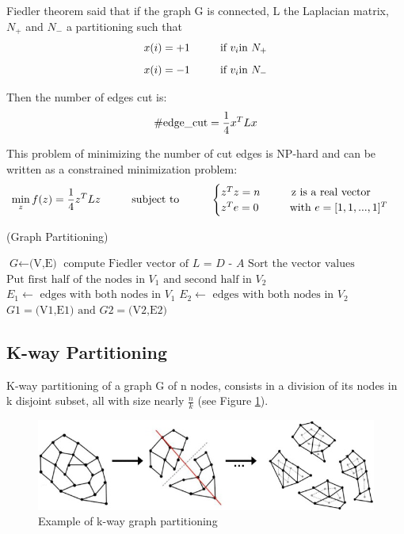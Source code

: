 \documentclass[]{usiinfbachelorproject}
\newcommand\tab[1][1cm]{\hspace*{#1}}
\begin{document}
Fiedler theorem said that if the graph G is connected, L the Laplacian matrix, $N_+$ and $N_-$ a partitioning such that
\begin{equation}\notag
x(i) = +1 \tab \text{if } v_i \text{in } N_+ 
\end{equation}
\begin{equation}\notag
x(i) = -1 \tab \text{if } v_i \text{in } N_-
\end{equation}

Then the number of edges cut is:
\begin{equation}\notag
\#\text{edge\_cut} = \frac{1}{4}x^T L x
\end{equation}

This problem of minimizing the number of cut edges is NP-hard and can be written as a constrained minimization problem:
\begin{equation}\notag
\min\limits_z f(z)=\frac{1}{4} z^T L z \tab \text{subject to} \tab 
\begin{cases}
z^T z = n \tab \text{z is a real vector}\\
z^T e = 0 \tab \text{with } e=[1,1,...,1]^T
\end{cases}
\end{equation}


\begin{algorithm}
\caption{ (Graph Partitioning)}\label{gpartitioning}
\begin{algorithmic}[1]
\State $\textit{G} \gets \text{(V,E)}$
\State $\text{compute Fiedler vector of } \textit{L = D - A}$
\State $\text{Sort the vector values}$
\State $\text{Put first half of the nodes in } V_1 \text{ and second half in } V_2$
\State $ E_1 \gets \text{ edges with both nodes in } V_1$
\State $ E_2 \gets \text{ edges with both nodes in } V_2$\\
\Return $\textit{G1} = \text{(V1,E1) and } \textit{G2} = \text{(V2,E2)}$
\EndProcedure
\end{algorithmic}
\end{algorithm}



\subsection{K-way Partitioning}
K-way partitioning of a graph G of n nodes, consists in a division of its nodes in k disjoint subset, all with size nearly $\frac{n}{k}$ (see Figure \ref{fig:kpartitioning}).

\begin{figure}[ht]
	\centering
	\includegraphics[height=3cm]{img/k_way_partitioning.jpg}
	\caption{Example of k-way graph partitioning}
	\label{fig:kpartitioning}
\end{figure}
\end{document}
